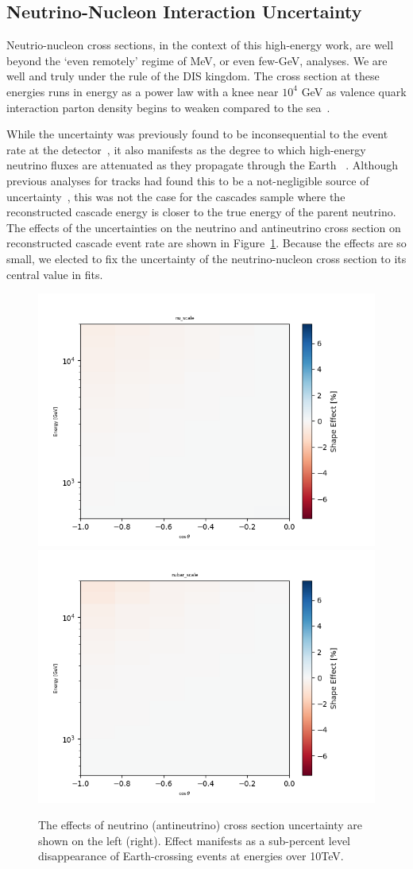 \documentclass[main.tex]{subfiles}
\begin{document}
\subsection{Neutrino-Nucleon Interaction Uncertainty}
Neutrio-nucleon cross sections, in the context of this high-energy work, are well beyond the `even remotely' regime of MeV, or even few-GeV, analyses.
We are well and truly under the rule of the DIS kingdom. 
The cross section at these energies runs in energy as a power law with a knee near $10^{4}$ GeV as valence quark interaction parton density begins to weaken compared to the sea~\cite{GANDHI199681}.

While the uncertainty was previously found to be inconsequential to the event rate at the detector~\cite{osti_1221354, 2015PhDT94D}, it also manifests as the degree to which high-energy neutrino fluxes are attenuated as they propagate through the Earth ~\cite{Vincent:2017svp, PhysRevD.83.113009, Cooper_Sarkar_2011}. 
Although previous analyses for tracks had found this to be a not-negligible source of uncertainty~\cite{Aartsen_2020, Aartsen_2020_prd}, this was not the case for the cascades sample where the reconstructed cascade energy is closer to the true energy of the parent neutrino.
The effects of the uncertainties on the neutrino and antineutrino cross section on reconstructed cascade event rate are shown in Figure~\ref{fig:nucross}.
Because the effects are so small, we elected to fix the uncertainty of the neutrino-nucleon cross section to its central value in fits. 

\begin{figure}
    \centering
    \includegraphics[width=0.45\linewidth]{figures/nu_scale.png}
    \includegraphics[width=0.45\linewidth]{figures/nubar_scale.png}
    \caption{The effects of neutrino (antineutrino) cross section uncertainty are shown on the left (right). Effect manifests as a sub-percent level disappearance of Earth-crossing events at energies over 10TeV.}\label{fig:nucross}
\end{figure}
\end{document}
